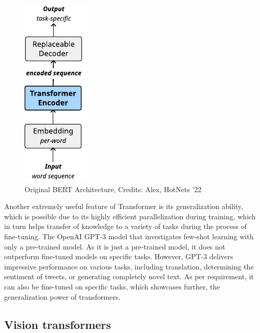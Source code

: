 \begin{figure}[!hbt]
  \begin{center}
    \includegraphics[scale=1.5]{figures/architecture_bert.pdf}
    \caption{Original BERT Architecture, Credits: Alex, HotNets '22}
    \label{fig:bert}
  \end{center}
\end{figure}



Another extremely useful feature of Transformer is its generalization ability, which is  possible due to its highly efficient parallelization during training, which in turn helps transfer of knowledge to a variety of tasks during the process of fine-tuning. The OpenAI GPT-3\cite{brownLanguageModelsAre2020} model that investigates few-shot learning with only a pre-trained model.
As it is just a pre-trained model, it does not outperform fine-tuned models on specific tasks. However, GPT-3 delivers impressive performance on various tasks, including translation, determining the sentiment of tweets, or generating completely novel text. As per requirement, it can also be fine-tuned on specific tasks, which showcases further, the generalization power of transformers.


\subsection{Vision transformers}
\label{ssec:bgvit}

